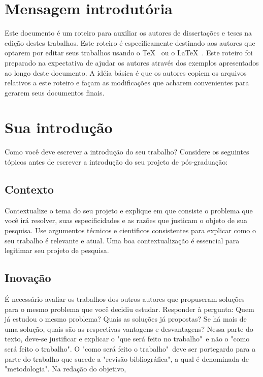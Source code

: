 \section{Mensagem introdutória}
Este documento é um roteiro para auxiliar os autores de
dissertações e teses na edição destes trabalhos.
Este roteiro é especificamente destinado aos autores que optarem
por editar seus trabalhos usando o \TeX\ \cite{knuth:tex,texbook} ou o \LaTeX\ \cite{lamport:latex,latexbook}.
Este roteiro foi preparado na expectativa de ajudar os autores
através dos exemplos apresentados ao longo deste documento. A
idéia básica é que os autores copiem os arquivos
relativos a este roteiro e façam as modificações que
acharem convenientes para gerarem seus documentos finais.

\section{Sua introdução}
Como você deve escrever a introdução do seu trabalho? Considere os seguintes tópicos antes de escrever a introdução do seu projeto de pós-graduação:

\subsection{Contexto}
Contextualize o tema do seu projeto e explique em que consiste o problema que você irá resolver, suas especificidades e as razões que justicam o objeto de sua pesquisa. Use argumentos técnicos e cientificos consistentes para explicar como o seu trabalho é relevante e  atual. Uma boa contextualização é essencial para legitimar seu projeto de pesquisa.

\subsection{Inovação}
É necessário avaliar os trabalhos dos outros autores que propuseram soluções para o mesmo problema que você decidiu estudar. Responder à pergunta: Quem já estudou o mesmo problema? Quais as soluções já propostas? Se há mais de uma solução, quais são as respectivas vantagens e desvantagens? Nessa parte do texto, deve-se justificar e explicar o "que será feito no trabalho"\ e não o "como será feito o trabalho". O "como será feito o trabalho"\ deve ser portegardo para a parte do trabalho que sucede a "revisão bibliográfica", a qual é denominada de "metodologia". Na redação do objetivo, 

